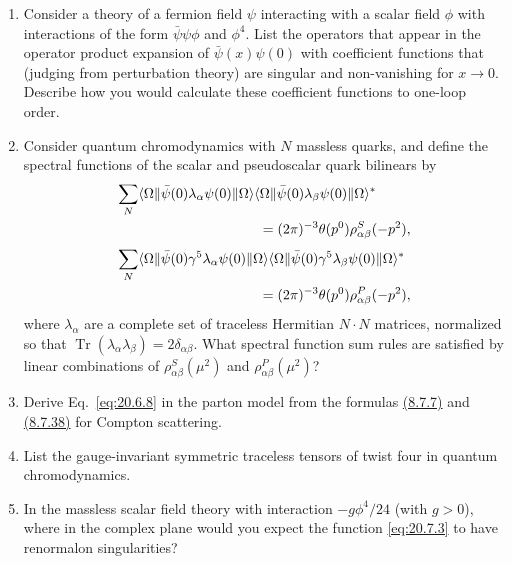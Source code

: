 

\begin{enumerate}
\item Consider a theory of a fermion field $\psi$ interacting with a scalar field $\phi$ with interactions of the form $\bar\psi\psi\phi$ and $\phi^4$. List the operators that appear in the operator product expansion of $\bar\psi(x)\psi(0)$ with coefficient functions that (judging from perturbation theory) are singular and non-vanishing for $x\to0$. Describe how you would calculate these coefficient functions to one-loop order.

\item Consider quantum chromodynamics with $N$ massless quarks, and define the spectral functions of the scalar and pseudoscalar quark bilinears by
\[
\begin{aligned}
&\sum_N
\bra{\Omega}\bar\psi(0)\lambda_\alpha\psi(0)\ket{\Omega}
\bra{\Omega}\bar\psi(0)\lambda_\beta\psi(0)\ket{\Omega}^{*}
\\
&\hspace{36mm}
=(2\pi)^{-3}\theta(p^0)\rho_{\alpha\beta}^{S}(-p^2),
\end{aligned}
\]
\[
\begin{aligned}
&\sum_N
\bra{\Omega}\bar\psi(0)\gamma^5\lambda_\alpha\psi(0)\ket{\Omega}
\bra{\Omega}\bar\psi(0)\gamma^5\lambda_\beta\psi(0)\ket{\Omega}^{*}
\\
&\hspace{36mm}
=(2\pi)^{-3}\theta(p^0)\rho_{\alpha\beta}^{P}(-p^2),
\end{aligned}
\]
where $\lambda_\alpha$ are a complete set of traceless Hermitian $N\cdot N$ matrices, normalized so that $\operatorname{Tr}(\lambda_\alpha\lambda_\beta)=2\delta_{\alpha\beta}$. What spectral function sum rules are satisfied by linear combinations of $\rho_{\alpha\beta}^{S}(\mu^2)$ and $\rho_{\alpha\beta}^{P}(\mu^2)$?

\item Derive Eq.~\eqref{eq:20.6.8} in the parton model from the formulas \hyperref[eq:8.7.7]{(8.7.7)} and \hyperref[eq:8.7.38]{(8.7.38)} for Compton scattering.

\item List the gauge-invariant symmetric traceless tensors of twist four in quantum chromodynamics.

\item In the massless scalar field theory with interaction $-g\phi^4/24$ (with $g>0$), where in the complex plane would you expect the function \eqref{eq:20.7.3} to have renormalon singularities?
\end{enumerate}

